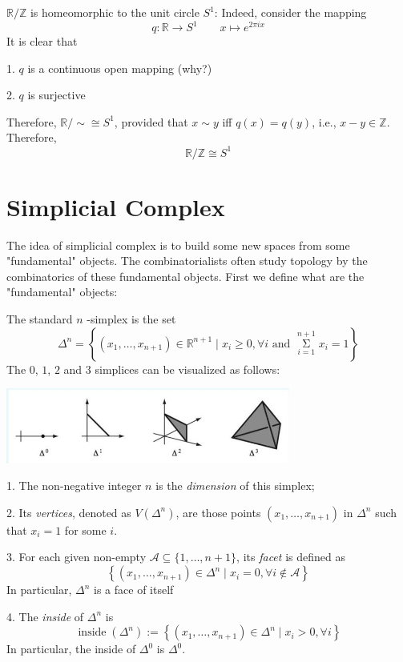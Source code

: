 \begin{example} \(\mathbb{R}/\mathbb{Z}\) is homeomorphic to the unit circle \({S}^{1}\): Indeed, consider the mapping
\[
q: \mathbb{R} \rightarrow  {S}^{1}
\quad \quad
x \mapsto  {e}^{2\pi ix}
\]
It is clear that

1. \(q\) is a continuous open mapping (why?)

2. \(q\) is surjective

Therefore, \(\mathbb{R}/ \sim   \cong  {S}^{1}\), provided that \(x \sim  y\) iff \(q\left( x\right)  = q\left( y\right)\), i.e., \(x - y \in  \mathbb{Z}\). Therefore,
\[
\mathbb{R}/\mathbb{Z} \cong  {S}^{1}
\]
\end{example}

\section{Simplicial Complex}
The idea of simplicial complex is to build some new spaces from some "fundamental" objects. The combinatorialists often study topology by the combinatorics of these fundamental objects. First we define what are the "fundamental" objects:

\begin{definition}[ \(n\) -simplex] \label{def:n_simplex} The standard \(n\) -simplex is the set
\[
{\Delta }^{n} = \left\{  {\left( {{x}_{1},\ldots,{x}_{n + 1}}\right)  \in  {\mathbb{R}}^{n + 1} \mid  {x}_{i} \geq  0,\forall i\text{ and }\mathop{\Sigma }\limits_{{i = 1}}^{{n + 1}}{x}_{i} = 1}\right\}
\]
The $0$, $1$, $2$ and $3$ simplices can be visualized as follows:
\begin{center}
\includegraphics[width=0.7\textwidth]{images/Ch4_simplices.jpg}
\end{center}

1. The non-negative integer \(n\) is the \emph{dimension} of this simplex;

2. Its \emph{vertices}, denoted as \(V\left( {\Delta }^{n}\right)\), are those points \(\left( {{x}_{1},\ldots,{x}_{n + 1}}\right)\) in \({\Delta }^{n}\) such that \({x}_{i} = 1\) for some \(i\).

3. For each given non-empty \(\mathcal{A} \subseteq  \{ 1,\ldots,n + 1\}\), its \emph{facet} is defined as
\[
\left\{  {\left( {{x}_{1},\ldots,{x}_{n + 1}}\right)  \in  {\Delta }^{n} \mid  {x}_{i} = 0,\forall i \notin  \mathcal{A}}\right\}
\]
In particular, \({\Delta }^{n}\) is a face of itself

4. The \emph{inside} of \({\Delta }^{n}\) is
\[
\operatorname{inside}\left( {\Delta }^{n}\right)  \mathrel{\text{:= }} \left\{  {\left( {{x}_{1},\ldots,{x}_{n + 1}}\right)  \in  {\Delta }^{n} \mid  {x}_{i} > 0,\forall i}\right\}
\]
In particular, the inside of \({\Delta }^{0}\) is \({\Delta }^{0}\).
\end{definition}

